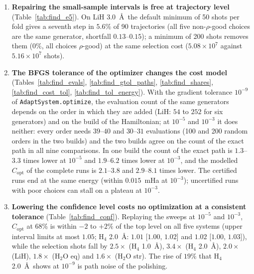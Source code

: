 \documentclass[11pt]{article}
\newcommand{\Copt}{C_{\mathrm{opt}}}
\begin{document}
\begin{enumerate}
  \item \textbf{Repairing the small-sample intervals is free at trajectory level} (Table~\ref{tab:find_e5}). On LiH 3.0~\AA\ the default minimum of 50 shots per fold gives a seventh step in $5.6\%$ of 90 trajectories (all five non-$\rho$-good choices are the same generator, shortfall $0.13$--$0.15$);
        a minimum of 200 shots removes them ($0\%$, all choices $\rho$-good) at the same selection cost ($5.08\times10^7$ against $5.16\times10^7$ shots).
  \item \textbf{The BFGS tolerance of the optimizer changes the cost model} (Tables~\ref{tab:find_evals}, \ref{tab:find_gtol_paths}, \ref{tab:find_shares}, \ref{tab:find_cost_tol}, \ref{tab:find_tol_energy}). With the gradient tolerance $10^{-9}$ of \texttt{AdaptSystem.optimize}, the evaluation count of the same generators depends on the order in which they are added
        (LiH: $54$ to $252$ for six generators) and on the build of the Hamiltonian; at $10^{-5}$ and $10^{-3}$ it does neither: every order needs $39$--$40$ and $30$--$31$ evaluations (100 and 200 random orders in the two builds) and the two builds agree on the count of the exact path in all nine comparisons.
        In one build the count of the exact path is $1.3$--$3.3$ times lower at $10^{-5}$ and $1.9$--$6.2$ times lower at $10^{-3}$, and the modelled $\Copt$ of the complete runs is $2.1$--$3.8$ and $2.9$--$8.1$ times lower. The certified runs end at the same energy (within $0.015$~mHa at $10^{-3}$); uncertified runs with poor choices can stall on a plateau at $10^{-3}$.
  \item \textbf{Lowering the confidence level costs no optimization at a consistent tolerance} (Table~\ref{tab:find_conf}). Replaying the sweeps at $10^{-5}$ and $10^{-3}$, $\Copt$ at 68\% is within $-2$ to $+2\%$ of the top level on all five systems (upper interval limits at most $1.05$; H$_4$ 2.0~\AA: $1.01$ [$1.00$, $1.02$] and $1.02$ [$1.00$, $1.03$]), while the selection shots fall by $2.5\times$ (H$_4$ 1.0~\AA), $3.4\times$ (H$_4$ 2.0~\AA), $2.0\times$ (LiH), $1.8\times$ (H$_2$O eq) and $1.6\times$ (H$_2$O str). The rise of $19\%$ that H$_4$ 2.0~\AA\ shows at $10^{-9}$ is path noise of the polishing.
\end{enumerate}
\end{document}
